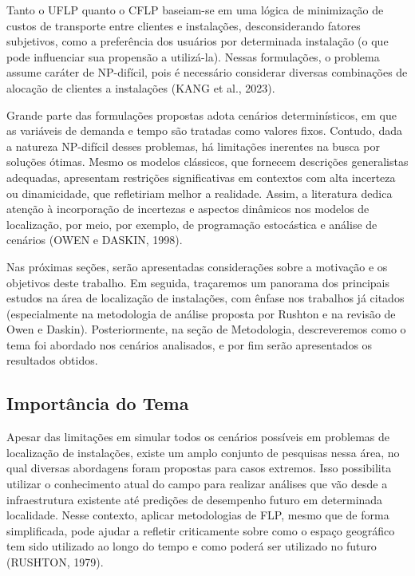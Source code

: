 \documentclass[12pt]{article}
\begin{document}
Tanto o UFLP quanto o CFLP baseiam-se em uma lógica de minimização de custos de transporte entre clientes e instalações, desconsiderando fatores subjetivos, como a preferência dos usuários por determinada instalação (o que pode influenciar sua propensão a utilizá-la). Nessas formulações, o problema assume caráter de NP-difícil, pois é necessário considerar diversas combinações de alocação de clientes a instalações (KANG et al., 2023).

Grande parte das formulações propostas adota cenários determinísticos, em que as variáveis de demanda e tempo são tratadas como valores fixos. Contudo, dada a natureza NP-difícil desses problemas, há limitações inerentes na busca por soluções ótimas. Mesmo os modelos clássicos, que fornecem descrições generalistas adequadas, apresentam restrições significativas em contextos com alta incerteza ou dinamicidade, que refletiriam melhor a realidade. Assim, a literatura dedica atenção à incorporação de incertezas e aspectos dinâmicos nos modelos de localização, por meio, por exemplo, de programação estocástica e análise de cenários (OWEN e DASKIN, 1998).

Nas próximas seções, serão apresentadas considerações sobre a motivação e os objetivos deste trabalho. Em seguida, traçaremos um panorama dos principais estudos na área de localização de instalações, com ênfase nos trabalhos já citados (especialmente na metodologia de análise proposta por Rushton e na revisão de Owen e Daskin). Posteriormente, na seção de Metodologia, descreveremos como o tema foi abordado nos cenários analisados, e por fim serão apresentados os resultados obtidos.

\subsection{Importância do Tema}

Apesar das limitações em simular todos os cenários possíveis em problemas de localização de instalações, existe um amplo conjunto de pesquisas nessa área, no qual diversas abordagens foram propostas para casos extremos. Isso possibilita utilizar o conhecimento atual do campo para realizar análises que vão desde a infraestrutura existente até predições de desempenho futuro em determinada localidade. Nesse contexto, aplicar metodologias de FLP, mesmo que de forma simplificada, pode ajudar a refletir criticamente sobre como o espaço geográfico tem sido utilizado ao longo do tempo e como poderá ser utilizado no futuro (RUSHTON, 1979).
\end{document}
